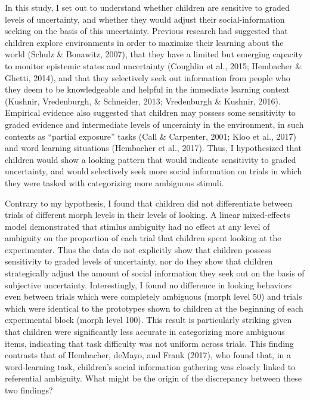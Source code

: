 \documentclass[floatsintext,man]{apa6}
\theoremstyle{definition}
\theoremstyle{definition}
\theoremstyle{definition}
\theoremstyle{remark}
\begin{document}
In this study, I set out to understand whether children are sensitive to
graded levels of uncertainty, and whether they would adjust their
social-information seeking on the basis of this uncertainty. Previous
research had suggested that children explore environments in order to
maximize their learning about the world (Schulz \& Bonawitz, 2007), that
they have a limited but emerging capacity to monitor epistemic states
and uncertainty (Coughlin et al., 2015; Hembacher \& Ghetti, 2014), and
that they selectively seek out information from people who they deem to
be knowledgeable and helpful in the immediate learning context (Kushnir,
Vredenburgh, \& Schneider, 2013; Vredenburgh \& Kushnir, 2016).
Empirical evidence also suggested that children may possess some
sensitivity to graded evidence and intermediate levels of uncerainty in
the environment, in such contexts as \enquote{partial exposure} tasks
(Call \& Carpenter, 2001; Kloo et al., 2017) and word learning
situations (Hembacher et al., 2017). Thus, I hypothesized that children
would show a looking pattern that would indicate sensitivity to graded
uncertainty, and would selectively seek more social information on
trials in which they were tasked with categorizing more ambiguous
stimuli.

Contrary to my hypothesis, I found that children did not differentiate
between trials of different morph levels in their levels of looking. A
linear mixed-effects model demonstrated that stimlus ambiguity had no
effect at any level of ambiguity on the proportion of each trial that
children spent looking at the experimenter. Thus the data do not
explicitly show that children possess sensitivity to graded levels of
uncertainty, nor do they show that children strategically adjust the
amount of social information they seek out on the basis of subjective
uncertainty. Interestingly, I found no difference in looking behaviors
even between trials which were completely ambiguous (morph level 50) and
trials which were identical to the prototypes shown to children at the
beginning of each experimental block (morph level 100). This result is
particularly striking given that children were significantly less
accurate in categorizing more ambiguous items, indicating that task
difficulty was not uniform across trials. This finding contrasts that of
Hembacher, deMayo, and Frank (2017), who found that, in a word-learning
task, children's social information gathering was closely linked to
referential ambiguity. What might be the origin of the discrepancy
between these two findings?
\end{document}
